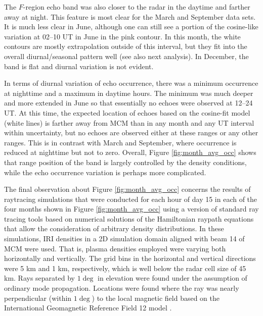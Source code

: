 The \(F\)-region echo band was also closer to the radar in the daytime and farther away at night. This feature is most clear for the March and September data sets. It is much less clear in June, although one can still see a portion of the cosine-like variation at 02--10 UT in June in the pink contour. In this month, the white contours are mostly extrapolation outside of this interval, but they fit into the overall diurnal/seasonal pattern well (see also next analysis).  In December, the band is flat and diurnal variation is not evident.

In terms of diurnal variation of echo occurrence, there was a minimum occurrence at nighttime and a maximum in daytime hours. The minimum was much deeper and more extended in June so that essentially no echoes were observed at 12--24 UT. At this time, the expected location of echoes based on the cosine-fit model (white lines) is farther away from MCM than in any month and any UT interval within uncertainty, but no echoes are observed either at these ranges or any other ranges. This is in contrast with March and September, where occurrence is reduced at nighttime but not to zero. Overall, Figure \ref{fig:month_avg_occ} shows that range position of the band is largely controlled by the density conditions, while the echo occurrence variation is perhaps more complicated.

The final observation about Figure \ref{fig:month_avg_occ} concerns the results of raytracing simulations that were conducted for each hour of day 15 in each of the four months shown in Figure \ref{fig:month_avg_occ} using a version of standard ray tracing tools based on numerical solutions of the Hamiltonian raypath equations \citep{Haselgrove1963,Jones1975} that allow the consideration of arbitrary density distributions. In these simulations, IRI densities in a 2D simulation domain aligned with beam 14 of MCM were used.  That is, plasma densities employed were varying both horizontally and vertically.  The grid bins in the horizontal and vertical directions were 5 km and 1 km, respectively, which is well below the radar cell size of 45 km.  Rays separated by \(1\deg\) in elevation were found under the assumption of ordinary mode propagation.  Locations were found where the ray was nearly perpendicular (within \(1\deg\)) to the local magnetic field based on the International Geomagnetic Reference Field 12 model \citep{Thebault2015}.

